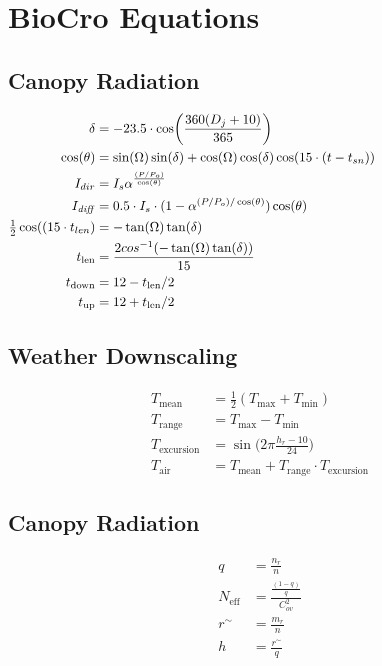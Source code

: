\documentclass[10pt]{article}
\renewcommand{\marginnote}[2][]{}
\begin{document}
\section*{BioCro Equations}

\subsection*{Canopy Radiation}

\begin{align}
 \delta  &=  -23.5 \cdot \cos\biggl(\frac{360(D_{j}+10)}{365}\biggr) \hspace{2.5in} \label{eqn:delt} \\
 \cos(\theta)   &=  \sin(\Omega)\sin(\delta)+\cos(\Omega)\cos(\delta)\cos(15\cdot(t-t_{sn}))  \label{eqn:costheta}\\
 I_{dir}   &=  I_{s}\alpha^{\frac{(P/P_{o})}{\cos(\theta)}} \label{eqn:Idir}\\
 I_{\mathit{diff}}  &=   0.5 \cdot I_{s}\cdot(1-\alpha^{(P/P_{o})/\cos(\theta)})\cos(\theta) \\%
\tfrac{1}{2} \cos((15 \cdot t_{len})  &=  -\tan(\Omega)\tan(\delta) \label{eqn:costlen_old}  \\
t_\text{len} &= \frac{2cos^{-1}(-\tan(\Omega)\tan(\delta))}{15}\label{eqn:costlen} \\
t_\text{down} &= 12-t_\text{len}/2\\
t_\text{up} &= 12+t_\text{len}/2
\end{align}


\subsection*{Weather Downscaling}
\begin{align}
T_\text{mean} &= \frac{1}{2}\left(T_\text{max} + T_\text{min}\right)\\
T_\text{range} &= T_\text{max} - T_\text{min}\\
T_\text{excursion}  &=  \sin\biggl(2 \pi \frac{h_{r}-10}{24}\biggr) \label{eqn:excur} \\
 T_\text{air}  &=   T_\text{mean} + T_\text{range} \cdot T_\text{excursion} \label{eqn:Tair} 
\end{align}

\subsection*{Canopy Radiation}
\begin{align}
 q  &=  \frac{n_r}{n} \label{eqn:q} \\
 N_\text{eff}  &=  \frac{\frac{(1-q)}{q}}{C_{ov}^{2}} \label{eqn:Neff}\\
 r^{\sim}  &=  \frac{m_r}{n} \label{eqn:rsim} \\
 h  &=  \frac{r^{\sim}}{q} \label{eqn:h} 
\end{align}
\end{document}
